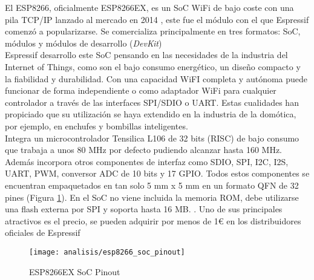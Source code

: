 \documentclass[../proyecto.tex]{subfiles}
\begin{document}
El ESP8266, oficialmente ESP8266EX, es un SoC WiFi de bajo coste con una pila TCP/IP lanzado al mercado en 2014 \cite{esp8266_overview}, este fue el módulo con el que Espressif comenzó a popularizarse. Se comercializa principalmente en tres formatos: SoC, módulos y módulos de desarrollo (\textit{DevKit})\\

Espressif desarrollo este SoC pensando en las necesidades de la industria del Internet of Things, como son el bajo consumo energético, un diseño compacto y la fiabilidad y durabilidad. Con una capacidad WiFI completa y autónoma puede funcionar de forma independiente o como adaptador WiFi para cualquier controlador a través de las interfaces SPI/SDIO o UART. Estas cualidades han propiciado que su utilización se haya extendido en la industria de la domótica, por ejemplo, en enchufes y bombillas inteligentes. \\

Integra un microcontrolador Tensilica L106 de 32 bits (RISC) de bajo consumo que trabaja a unos 80 MHz por defecto pudiendo alcanzar hasta 160 MHz. Además incorpora otros componentes de interfaz como SDIO, SPI, I2C, I2S, UART, PWM, conversor ADC de 10 bits y 17 GPIO. Todos estos componentes se encuentran empaquetados en tan solo 5 mm x 5 mm en un formato QFN de 32 pines (Figura \ref{fig:esp8266_soc_pinout}). En el SoC no viene incluida la memoria ROM, debe utilizarse una flash externa por SPI y soporta hasta 16 MB. \cite{esp8266_datasheet}. Uno de sus principales atractivos es el precio, se pueden adquirir por menos de 1€ en los distribuidores oficiales de Espressif \cite{espressif_provider_digikey} \cite{espressif_provider_mouser}\\


\begin{figure}[H]
\centering
\texttt{[image: analisis/esp8266\_soc\_pinout]}
\caption{ESP8266EX SoC Pinout}
\label{fig:esp8266_soc_pinout}
\end{figure}
\end{document}
